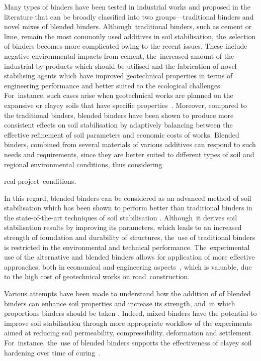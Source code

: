 \documentclass[materials,article,accept,pdftex,moreauthors]{Definitions/mdpi}
\begin{document}
Many types of binders have been tested in industrial works and proposed in the literature that can be broadly classified into two groups---traditional binders and novel mixes of blended binders. Although~traditional binders, such as cement or lime, remain the most commonly used additives in soil stabilisation, the~selection of binders becomes more complicated owing to the recent issues. These include negative environmental impacts from cement, the~increased amount of the industrial by-products which should be utilised and the fabrication of novel stabilising agents which have improved geotechnical properties in terms of engineering performance and better suited to the ecological challenges. For~instance, such cases arise when geotechnical works are planned on the expansive or clayey soils that have specific properties~\cite{Nelson}. Moreover, compared to the traditional binders, blended binders have been shown to produce more consistent effects on soil stabilisation by adaptively balancing between the effective refinement of soil parameters and economic costs of works. Blended binders, combined from several materials of various additives can respond to such needs and requirements, since they are better suited to different types of soil and regional environmental conditions, thus considering {real project~conditions.

In this regard, blended binders can be considered as an advanced method of soil stabilisation which has been shown to perform better than traditional binders in the state-of-the-art techniques of soil stabilisation \citep{Jegandanetal2010,Jafer2017}. Although~it derives soil stabilisation results by improving its parameters, which leads to an increased strength of foundation and durability of structures, the~use of traditional binders is restricted in the environmental and technical performance. The~experimental use of the alternative and blended binders allows for application of more effective approaches, both in economical and engineering \mbox{aspects~\cite{Mavroulidou},} which is valuable, due to the high cost of geotechnical works on \mbox{road construction. }

Various attempts have been made to understand how the addition of of blended binders can enhance soil properties and increase its strength, and~in which proportions binders should be taken \citep{AlSwaidani,Fasihnikoutalab,Kogbara,Verhasselt,Sherwood,Chaddock}. Indeed, mixed binders have the potential to improve soil stabilisation through more appropriate workflow of the experiments aimed at reducing soil permeability, compressibility, deformation and settlement. For~instance, the~use of blended binders supports the effectiveness of clayey soil hardening over time of curing~\cite{Wangetal2015,Gandhi,LindhLemenkova2021a}. 

}
\end{document}
